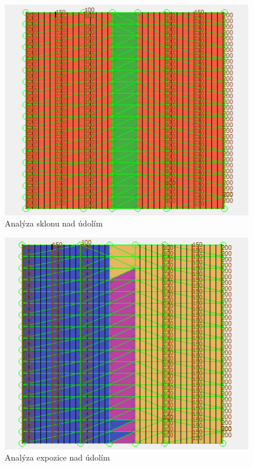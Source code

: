 \documentclass[a4paper,11pt,twoside]{article}
\begin{document}
\vspace{0.2cm}
\begin{figure}[hbt!] 
\begin{center}
\includegraphics[width=11cm]{pictures/valley_slope.PNG} 
\caption[Analýza sklonu nad údolím]{Analýza sklonu nad údolím}
\label{fig:valley_slope}
\end{center}
\end{figure}

\vspace{0.2cm}
\begin{figure}[hbt!] 
\begin{center}
\includegraphics[width=11cm]{pictures/valley_aspect.PNG} 
\caption[Analýza expozice nad údolím]{Analýza expozice nad údolím}
\label{fig:valley_aspect}
\end{center}
\end{figure}
\end{document}
